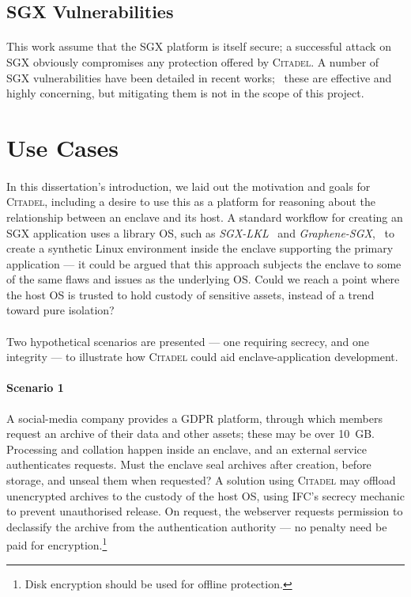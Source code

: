 \subsection{SGX Vulnerabilities}
\label{sec:sgx-vulnerabilities}
\paragraph{} This work assume that the SGX platform is itself secure; a successful attack on SGX obviously compromises any protection offered by \textsc{Citadel}. A number of SGX vulnerabilities have been detailed in recent works;~\cite{lipp2018meltdown, vanbulck2018foreshadow, Schwarz2019ZombieLoad, ridl, vanbulck2020lvi} these are effective and highly concerning, but mitigating them is not in the scope of this project.

\section{Use Cases}

\paragraph{} In this dissertation's introduction, we laid out the motivation and goals for \textsc{Citadel}, including a desire to use this as a platform for reasoning about the relationship between an enclave and its host. A standard workflow for creating an SGX application uses a library OS, such as \textit{SGX-LKL}~\cite{priebe2019sgxlkl} and \textit{Graphene-SGX},~\cite{203255} to create a synthetic Linux environment inside the enclave supporting the primary application --- it could be argued that this approach subjects the enclave to some of the same flaws and issues as the underlying OS. Could we reach a point where the host OS is trusted to hold custody of sensitive assets, instead of a trend toward pure isolation?

\paragraph{} Two hypothetical scenarios are presented --- one requiring secrecy, and one integrity --- to illustrate how \textsc{Citadel} could aid enclave-application development.

\paragraph{Scenario 1} A social-media company provides a GDPR platform, through which members request an archive of their data and other assets; these may be over 10~GB. Processing and collation happen inside an enclave, and an external service authenticates requests. Must the enclave seal archives after creation, before storage, and unseal them when requested? A solution using \textsc{Citadel} may offload unencrypted archives to the custody of the host OS, using IFC's secrecy mechanic to prevent unauthorised release. On request, the webserver requests permission to declassify the archive from the authentication authority --- no penalty need be paid for encryption.\footnote{Disk encryption should be used for offline protection.}


